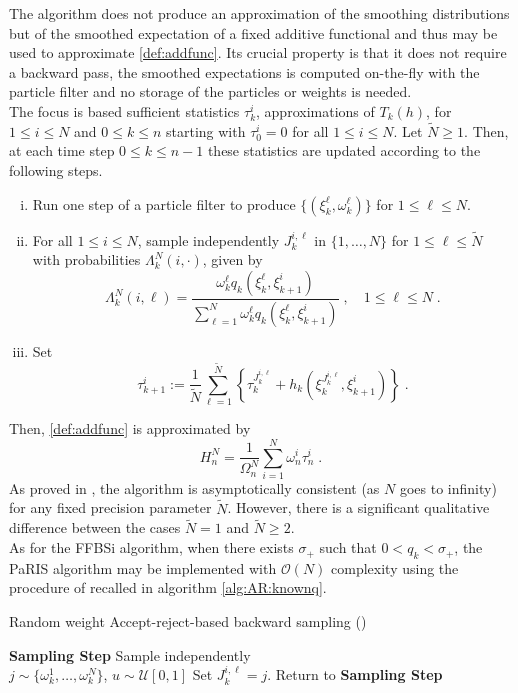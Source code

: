 \documentclass[12pt]{article}
\newcommand{\eqsp}{\;}
\newcommand{\1}{\mathrm{1}}
\newcommand{\qk}{q_{k}}
\begin{document}
The algorithm does not produce an approximation of the smoothing distributions but of the smoothed expectation of a fixed additive functional and thus  may be used to approximate \eqref{def:addfunc}. 
Its crucial property is that it does not require a backward pass, the smoothed expectations is computed on-the-fly with the particle filter and no storage of the particles or weights is needed.\\ 
The focus is based sufficient statistics $\tau^i_k$, approximations of $T_k(h)$, for $1\le i\le N$ and $0\le k \le n$ starting with $\tau^i_0 = 0$ for all $1\le i\le N$. Let $\tilde{N}\ge 1$. Then, at each time step $0\le k \le {n-1}$ these statistics are updated according to the following steps.
\begin{enumerate}[(i)]
\item \label{it:PaRIS:filt} Run one step of a particle filter to produce $\{(\xi^{\ell}_k, \omega^{\ell}_k)\}$ for $1\le \ell \le N$.
\item \label{it:PaRIS:sampleindex} For all $1\le i \le N$, sample independently $J_{k}^{i,\ell}$ in $\{1,\ldots,N\}$ for $1\le \ell \le \widetilde N$ with probabilities $\Lambda_{k}^N(i,\cdot)$, given by
\[
\Lambda_{k}^N(i,\ell) = \frac{\omega^{\ell}_{k} \qk(\xi^{\ell}_{k},\xi_{k+1}^{i})}{\sum_{\ell=1}^N\omega^{\ell}_{k} \qk(\xi^{\ell}_{k},\xi_{k+1}^{i})}\eqsp,\quad 1\le \ell\le N\eqsp.
\]
\item \label{it:PaRIS:smooth} Set
\[
\tau^{i}_{k+1} := \frac{1}{\widetilde{N}} \sum^{\widetilde{N}}_{\ell=1} \left\{ \tau^{J_{k}^{i,\ell}}_{k} + h_{k} \left(\xi^{J_{k}^{i,\ell}}_{k}, \xi^{i}_{k+1}\right)  \right\}\eqsp.
\]
\end{enumerate}
Then, \eqref{def:addfunc} is approximated by
\[
H_n^N = \frac{1}{\Omega_n^N}\sum_{i=1}^N \omega^{i}_n \tau_n^i\eqsp.
\] 
As proved in \cite{olsson:westerborn:2016}, the algorithm is asymptotically consistent (as $N$ goes to infinity) for any fixed precision parameter $\tilde N$. However, there is a significant qualitative difference between the cases $\tilde{N} = 1$ and $\tilde{N} \geq 2$.\\
As for the FFBSi algorithm,  when there exists $\sigma_+$ such that $0<\qk <\sigma_+$, the PaRIS algorithm may be implemented with $\mathcal{O}(N)$ complexity using the procedure of \cite{douc:garivier:moulines:olsson:2011} recalled in algorithm \ref{alg:AR:knownq}.
\begin{algorithm}[hb]
\caption{Random weight Accept-reject-based backward sampling  (\cite{douc:garivier:moulines:olsson:2011})}
\begin{algorithmic}
\STATE \textbf{\sc Sampling Step} Sample independently\\ $j\sim \{\omega_{k}^1,\dots,\omega_{k}^N\}$, $u\sim \mathcal{U}[0,1]$
\IF{ $$u \leq \frac{\qk(\xi_{k}^j,\xi_{k+1}^i,z)}{\sigma_+},$$}
\STATE Set $J_k^{i,\ell} = j$.
\ELSE 
\STATE Return to \textbf{\sc Sampling Step}
\ENDIF
\ENDFOR
\ENDFOR
\end{algorithmic}
\label{alg:AR:knownq}
\end{algorithm}
\end{document}
